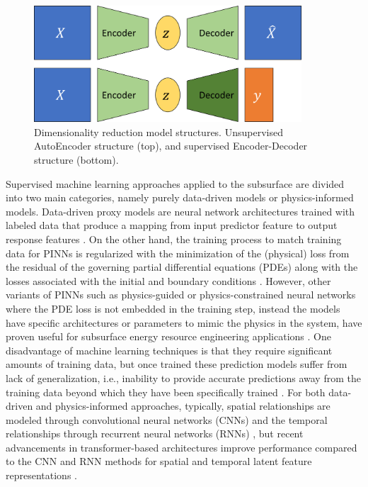 \documentclass[10pt, twoside]{article}
\begin{document}
\begin{figure}
    \centering
    \includegraphics[width=10cm]{figures/latentAE.png}
    \caption{Dimensionality reduction model structures. Unsupervised AutoEncoder structure (top), and supervised Encoder-Decoder structure (bottom).}
    \label{latentAE}
\end{figure}

Supervised machine learning approaches applied to the subsurface are divided into two main categories, namely purely data-driven models or physics-informed models. Data-driven proxy models are neural network architectures trained with labeled data that produce a mapping from input predictor feature to output response features \cite{Oladyshkin2013671, Bao2019}. On the other hand, the training process to match training data for PINNs is regularized with the minimization of the (physical) loss from the residual of the governing partial differential equations (PDEs) along with the losses associated with the initial and boundary conditions \cite{karniadakis2021physics, yang2018physicsinformed}. However, other variants of PINNs such as physics-guided or physics-constrained neural networks where the PDE loss is not embedded in the training step, instead the models have specific architectures or parameters to mimic the physics in the system, have proven useful for subsurface energy resource engineering applications \cite{Wang2021, Coutinho2021, Zhu_2019}. One disadvantage of machine learning techniques is that they require significant
amounts of training data, but once trained these prediction models suffer from lack of generalization, i.e., inability to provide accurate predictions away from the training data beyond which they have been specifically trained \cite{Yegnanarayana2009ArtificialNetworks, heaton2018ian}. For both data-driven and physics-informed approaches, typically, spatial relationships are modeled through convolutional neural networks (CNNs) \cite{liu20213d, Yang2022} and the temporal relationships through recurrent neural networks (RNNs) \cite{jiang2021data, Ning2022}, but recent advancements in transformer-based architectures improve performance compared to the CNN and RNN methods for spatial and temporal latent feature representations \cite{liu2021swin, 10.1190/geo2022-0150.1, maldonado4403939multi}.
\end{document}
